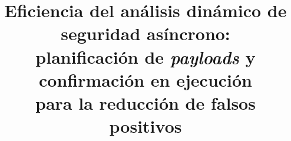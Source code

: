 
\title{Eficiencia del análisis dinámico de seguridad asíncrono:\\
planificación de \emph{payloads} y confirmación en ejecución\\
para la reducción de falsos positivos}

\author{%
}

\maketitle

